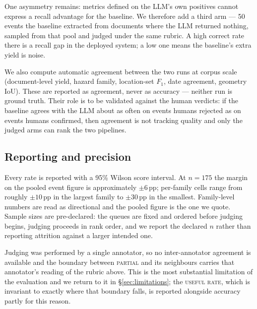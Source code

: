 One asymmetry remains: metrics defined on the LLM's own positives cannot
express a recall advantage for the baseline. We therefore add a third arm ---
50 events the baseline extracted from documents where the LLM returned nothing,
sampled from that pool and judged under the same rubric. A high correct rate
there is a recall gap in the deployed system; a low one means the baseline's
extra yield is noise.

We also compute automatic agreement between the two runs at corpus scale
(document-level yield, hazard family, location-set $F_1$, date agreement,
geometry IoU). These are reported as agreement, never as accuracy --- neither
run is ground truth. Their role is to be validated against the human verdicts:
if the baseline agrees with the LLM about as often on events humans rejected as
on events humans confirmed, then agreement is not tracking quality and only the
judged arms can rank the two pipelines.

\subsection{Reporting and precision}
\label{ssec:precision}

Every rate is reported with a 95\% Wilson score interval. At $n=175$ the margin
on the pooled event figure is approximately $\pm 6$\,pp; per-family cells range
from roughly $\pm 10$\,pp in the largest family to $\pm 30$\,pp in the
smallest. Family-level numbers are read as directional and the pooled figure is
the one we quote. Sample sizes are pre-declared: the queues are fixed and
ordered before judging begins, judging proceeds in rank order, and we report
the declared $n$ rather than reporting attrition against a larger intended one.

Judging was performed by a single annotator, so no inter-annotator agreement is
available and the boundary between \textsc{partial} and its neighbours carries
that annotator's reading of the rubric above. This is the most substantial
limitation of the evaluation and we return to it in \S\ref{sec:limitations};
the \textsc{useful rate}, which is invariant to exactly where that boundary
falls, is reported alongside accuracy partly for this reason.
